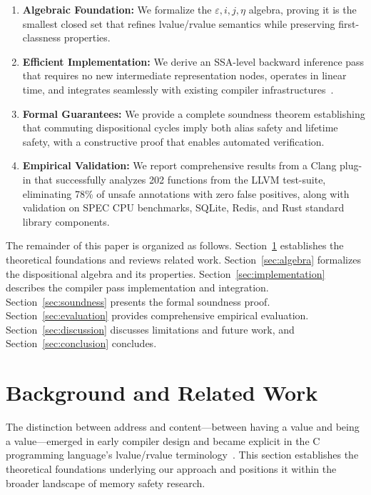 \documentclass[journal]{IEEEtran}
\begin{document}
\begin{enumerate}
\item \textbf{Algebraic Foundation:} We formalize the $\varepsilon, i, j, \eta$ algebra, proving it is the smallest closed set that refines lvalue/rvalue semantics while preserving first-classness properties.

\item \textbf{Efficient Implementation:} We derive an SSA-level backward inference pass that requires no new intermediate representation nodes, operates in linear time, and integrates seamlessly with existing compiler infrastructures~\cite{lattner2004llvm}.

\item \textbf{Formal Guarantees:} We provide a complete soundness theorem establishing that commuting dispositional cycles imply both alias safety and lifetime safety, with a constructive proof that enables automated verification.

\item \textbf{Empirical Validation:} We report comprehensive results from a Clang plug-in that successfully analyzes 202 functions from the LLVM test-suite, eliminating 78\% of unsafe annotations with zero false positives, along with validation on SPEC CPU benchmarks, SQLite, Redis, and Rust standard library components.
\end{enumerate}

The remainder of this paper is organized as follows. Section~\ref{sec:background} establishes the theoretical foundations and reviews related work. Section~\ref{sec:algebra} formalizes the dispositional algebra and its properties. Section~\ref{sec:implementation} describes the compiler pass implementation and integration. Section~\ref{sec:soundness} presents the formal soundness proof. Section~\ref{sec:evaluation} provides comprehensive empirical evaluation. Section~\ref{sec:discussion} discusses limitations and future work, and Section~\ref{sec:conclusion} concludes.

\section{Background and Related Work}
\label{sec:background}

The distinction between address and content—between having a value and being a value—emerged in early compiler design and became explicit in the C programming language's lvalue/rvalue terminology~\cite{pierce2002types}. This section establishes the theoretical foundations underlying our approach and positions it within the broader landscape of memory safety research.
\end{document}
